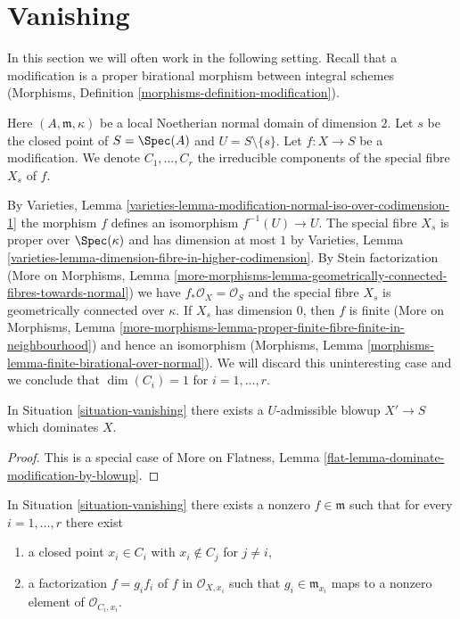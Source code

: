 \section{Vanishing}
\label{section-vanishing}

\noindent
In this section we will often work in the following setting.
Recall that a modification is a proper birational morphism
between integral schemes (Morphisms, Definition
\ref{morphisms-definition-modification}).

\begin{situation}
\label{situation-vanishing}
Here $(A, \mathfrak m, \kappa)$ be a local Noetherian normal domain of
dimension $2$. Let $s$ be the closed point of $S = \Spec(A)$ and
$U = S \setminus \{s\}$. Let $f : X \to S$ be a modification.
We denote $C_1, \ldots, C_r$ the irreducible
components of the special fibre $X_s$ of $f$.
\end{situation}

\noindent
By Varieties, Lemma
\ref{varieties-lemma-modification-normal-iso-over-codimension-1}
the morphism $f$ defines an isomorphism $f^{-1}(U) \to U$.
The special fibre $X_s$ is proper over $\Spec(\kappa)$ and
has dimension at most $1$ by Varieties, Lemma
\ref{varieties-lemma-dimension-fibre-in-higher-codimension}.
By Stein factorization (More on Morphisms, Lemma
\ref{more-morphisms-lemma-geometrically-connected-fibres-towards-normal})
we have $f_*\mathcal{O}_X = \mathcal{O}_S$ and
the special fibre $X_s$ is geometrically connected over $\kappa$.
If $X_s$ has dimension $0$, then $f$ is finite
(More on Morphisms, Lemma
\ref{more-morphisms-lemma-proper-finite-fibre-finite-in-neighbourhood})
and hence an isomorphism
(Morphisms, Lemma \ref{morphisms-lemma-finite-birational-over-normal}).
We will discard this uninteresting case and we conclude that
$\dim(C_i) = 1$ for $i = 1, \ldots, r$.

\begin{lemma}
\label{lemma-dominate-by-scheme-modification}
In Situation \ref{situation-vanishing} there exists a $U$-admissible
blowup $X' \to S$ which dominates $X$.
\end{lemma}

\begin{proof}
This is a special case of
More on Flatness, Lemma \ref{flat-lemma-dominate-modification-by-blowup}.
\end{proof}

\begin{lemma}
\label{lemma-nice-meromorphic-function}
In Situation \ref{situation-vanishing} there exists a nonzero
$f \in \mathfrak m$ such that for every $i = 1, \ldots, r$ there exist
\begin{enumerate}
\item a closed point $x_i \in C_i$ with $x_i \not \in C_j$ for $j \not = i$,
\item a factorization $f = g_i f_i$ of $f$ in $\mathcal{O}_{X, x_i}$
such that $g_i \in \mathfrak m_{x_i}$ maps to a nonzero element
of $\mathcal{O}_{C_i, x_i}$.
\end{enumerate}
\end{lemma}

